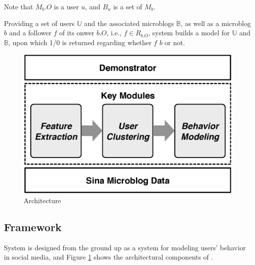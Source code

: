 Note that $M_b.O$ is a user $u$, and $B_u$ is a set of $M_b$.


Providing a set of users $\mathbb{U}$ and the associated microblogs $\mathbb{B}$, as well as a microblog $b$ and a follower $f$ of its onwer $b.O$, i.e., $f \in R_{b.O}$, system \sys{} builds a \retg{} model for $\mathbb{U}$ and $\mathbb{B}$, upon which 1/0 is returned regarding whether $f$  $b$ or not.

\begin{figure}[tb!]
\centering
\includegraphics[width=.7\linewidth]{figures/architecture.eps}
\vspace{-1ex}
\caption{\sys{} Architecture}
\label{fig:framework}
\vspace{-2ex}
\end{figure}



\subsection{\sys{} Framework}
System \sys{} is designed from the ground up as a system for modeling users' \retg{} behavior in social media, and
Figure \ref{fig:framework} shows the architectural components of \sys{}. %








